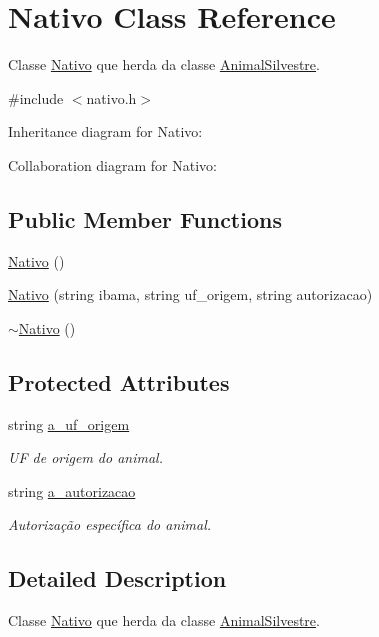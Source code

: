 \hypertarget{classNativo}{}\section{Nativo Class Reference}
\label{classNativo}


Classe \hyperlink{classNativo}{Nativo} que herda da classe \hyperlink{classAnimalSilvestre}{Animal\+Silvestre}.  




{\ttfamily \#include $<$nativo.\+h$>$}



Inheritance diagram for Nativo\+:


Collaboration diagram for Nativo\+:
\subsection*{Public Member Functions}
\begin{DoxyCompactItemize}
\item 
\hyperlink{classNativo_a629a232459030d1076dbf49728471342}{Nativo} ()
\item 
\hyperlink{classNativo_a94c929ae013bca74b95907af8f911793}{Nativo} (string ibama, string uf\+\_\+origem, string autorizacao)
\item 
\hyperlink{classNativo_ab89620a601de55e724bfe39f12600ca5}{$\sim$\+Nativo} ()
\end{DoxyCompactItemize}
\subsection*{Protected Attributes}
\begin{DoxyCompactItemize}
\item 
string \hyperlink{classNativo_a260f26d7ad44221c1dca0ec01183482a}{a\+\_\+uf\+\_\+origem}
\begin{DoxyCompactList}\small\item\em UF de origem do animal. \end{DoxyCompactList}\item 
string \hyperlink{classNativo_a1dc025166815eb0f250ce58330e4fbcb}{a\+\_\+autorizacao}
\begin{DoxyCompactList}\small\item\em Autorização específica do animal. \end{DoxyCompactList}\end{DoxyCompactItemize}


\subsection{Detailed Description}
Classe \hyperlink{classNativo}{Nativo} que herda da classe \hyperlink{classAnimalSilvestre}{Animal\+Silvestre}. 

